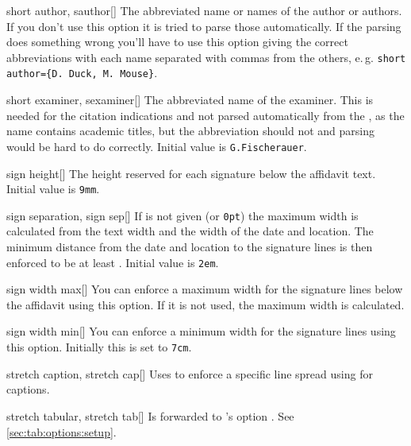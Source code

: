 \begin{describeopt}{short author, sauthor}[]
  The abbreviated name or names of the author or authors. If you don't use this
  option it is tried to parse those automatically. If the parsing does something
  wrong you'll have to use this option giving the correct abbreviations with
  each name separated with commas from the others, e.\,g.\@ 
  \texttt{short author=\{D. Duck, M. Mouse\}}.
\end{describeopt}
\begin{describeopt}{short examiner, sexaminer}[]
  The abbreviated name of the examiner. This is needed for the citation
  indications and not parsed automatically from the , as the name
  contains academic titles, but the abbreviation should not and parsing would be
  hard to do correctly. Initial value is \texttt{G.\@ Fischerauer}.
\end{describeopt}
\begin{describeopt}{sign height}[]
  The height reserved for each signature below the affidavit text. Initial value
  is \texttt{9mm}.
\end{describeopt}
\begin{describeopt}{sign separation, sign sep}[]
  If  is not given (or \texttt{0pt}) the maximum width is
  calculated from the text width and the width of the date and location. The
  minimum distance from the date and location to the signature lines is then
  enforced to be at least . Initial value is \texttt{2em}.
\end{describeopt}
\begin{describeopt}{sign width max}[]
  You can enforce a maximum width for the signature lines below the affidavit
  using this option. If it is not used, the maximum width is calculated.
\end{describeopt}
\begin{describeopt}{sign width min}[]
  You can enforce a minimum width for the signature lines using this option.
  Initially this is set to \texttt{7cm}.
\end{describeopt}
\begin{describeopt}{stretch caption, stretch cap}[]
  Uses  to enforce a specific line spread using 
  for captions.
\end{describeopt}
\begin{describeopt}{stretch tabular, stretch tab}[]
  Is forwarded to 's option . See
  \autoref{sec:tab:options:setup}.
\end{describeopt}
